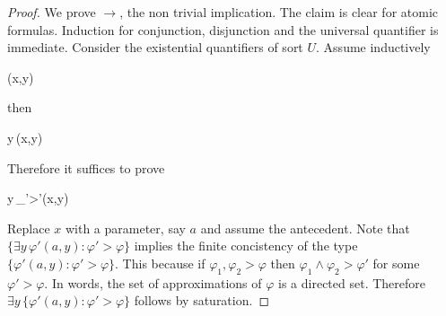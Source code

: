 \documentclass[11pt,oneside]{amsart}
\newcommand*{\TakeFourierOrnament}[1]{{%
\fontencoding{U}\fontfamily{futs}\selectfont\char#1}}
\renewcommand*{\danger}{\TakeFourierOrnament{66}}
\theoremstyle{plain}
\theoremstyle{remark}
\begin{document}
\begin{proof}
  We prove $\rightarrow$, the non trivial implication.
  The claim is clear for atomic formulas.
  Induction for conjunction, disjunction and the universal quantifier is immediate.
%
%
%
%
%
  Consider the existential quantifiers of sort $U$.
  Assume inductively
  
  {\rightarrow}
  {\varphi(x,y)}

  then 

  {\rightarrow}
  {\exists y\,\varphi(x,y)}

  Therefore it suffices to prove

  {\rightarrow}
  {\exists y\,\bigwedge_{\varphi'>\varphi}\varphi'(x,y)}

Replace $x$ with a parameter, say $a$ and assume the antecedent.
Note that $\{\exists y\,\varphi'(a,y):\varphi'>\varphi\}$ implies the finite concistency of the type $\{\varphi'(a,y):\varphi'>\varphi\}$.
This because if $\varphi_1,\varphi_2>\varphi$ then $\varphi_1\wedge\varphi_2>\varphi'$ for some $\varphi'>\varphi$.
In words, the set of approximations of $\varphi$ is a directed set.
Therefore $\exists y\,\{\varphi'(a,y):\varphi'>\varphi\}$ follows by saturation.
%
%
%
%
%
\end{proof}


\def\ceq#1#2#3{\parbox[t]{20ex}{$\displaystyle #1$}\parbox{5ex}{\hfil $#2$}{$\displaystyle #3$}}
\end{document}
